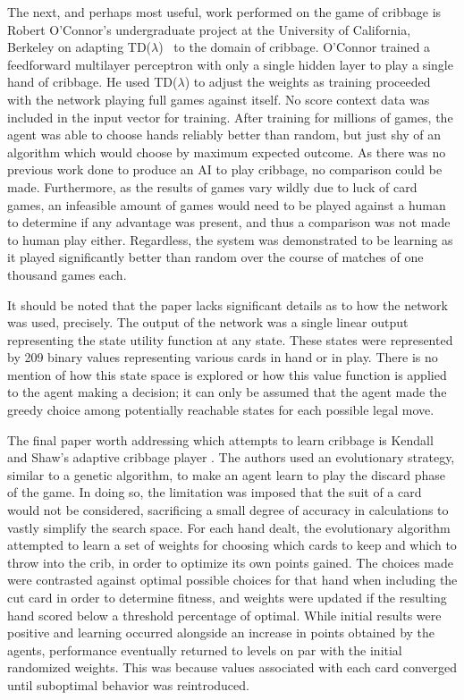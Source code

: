 The next,
and perhaps most useful,
work performed on the game of cribbage is Robert O'Connor's undergraduate
project at the University of California, Berkeley
\cite{roconnor_cs486}
on adapting TD($\lambda$)~\cite{tdgammon} to the domain of cribbage.
%
O'Connor trained a feedforward multilayer perceptron with only a single hidden
layer to play a single hand of cribbage.
%
He used TD($\lambda$) to adjust the weights as training proceeded with the
network playing full games against itself.
%
No score context data was included in the input vector for training.
%
After training for millions of games,
the agent was able to choose hands reliably better than random,
but just shy of an algorithm which would choose by maximum expected outcome.
%
As there was no previous work done to produce an AI to play cribbage,
no comparison could be made.
%
Furthermore,
as the results of games vary wildly due to luck of card games,
an infeasible amount of games would need to be played against a human to
determine if any advantage was present,
and thus a comparison was not made to human play either.
%
Regardless,
the system was demonstrated to be learning as it played significantly
better than random over the course of matches of one thousand games each.

It should be noted that the paper lacks significant details
as to how the network was used, precisely.
%
The output of the network was a single linear output representing the state
utility function at any state.
%
These states were represented by 209 binary values representing various cards in
hand or in play.
%
There is no mention of how this state space is explored or how this value
function is applied to the agent making a decision;
it can only be assumed that the agent made the greedy choice among potentially
reachable states for each possible legal move.

The final paper worth addressing which attempts to learn cribbage
is Kendall and Shaw's adaptive cribbage player
\cite{adaptive_cribbage}.
%
The authors used an evolutionary strategy,
similar to a genetic algorithm,
to make an agent learn to play the discard phase of the game.
%
In doing so,
the limitation was imposed that the suit of a card would not be considered,
sacrificing a small degree of accuracy in calculations to vastly simplify the
search space.
%
For each hand dealt,
the evolutionary algorithm attempted to learn a set of weights for choosing
which cards to keep and which to throw into the crib,
in order to optimize its own points gained.
%
The choices made were contrasted against optimal possible choices for that hand
when including the cut card in order to determine fitness,
and weights were updated if the resulting hand scored below a threshold
percentage of optimal.
%
While initial results were positive and learning occurred alongside an increase
in points obtained by the agents,
performance eventually returned to levels on par with the initial randomized
weights.
%
This was because values associated with each card converged until suboptimal
behavior was reintroduced.

